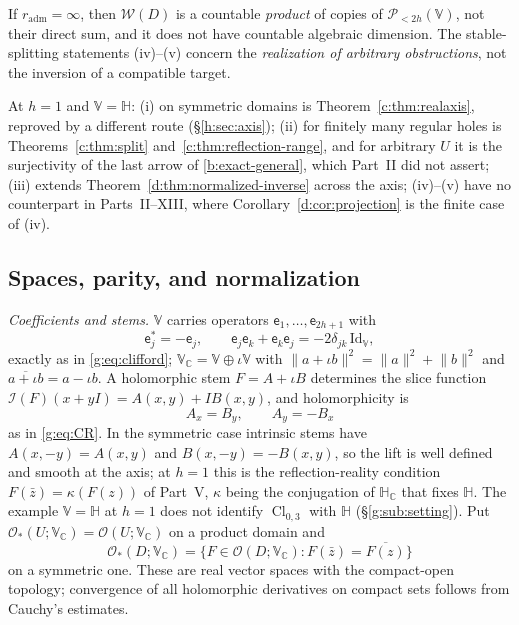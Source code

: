 \documentclass[11pt,a4paper]{article}
\numberwithin{equation}{section}
\theoremstyle{definition}
\theoremstyle{remark}
\theoremstyle{plain}
\newcommand{\HH}{\mathbb H}
\newcommand{\HC}{\mathbb H_{\mathbb C}}
\newcommand{\CC}{\mathbb C}
\newcommand{\I}{\mathcal I}
\newcommand{\norm}[1]{\lVert #1\rVert}
\newcommand{\VV}{\mathbb V}                       %
\newcommand{\VC}{\mathbb V_{\CC}}                 %
\newcommand{\PolH}{\mathscr P_{<2h}(\VV)}
\begin{document}
If $r_{\mathrm{adm}}=\infty$, then $\mathscr W(D)$ is a countable
\emph{product} of copies of $\PolH$, not their direct sum, and it does not have
countable algebraic dimension. The stable-splitting statements (iv)--(v)
concern the \emph{realization of arbitrary obstructions}, not the inversion of
a compatible target.

At $h=1$ and $\VV=\HH$: (i) on symmetric domains is
Theorem~\ref{c:thm:realaxis}, reproved by a different route
(\S\ref{h:sec:axis}); (ii) for finitely many regular holes is
Theorems~\ref{c:thm:split} and~\ref{c:thm:reflection-range}, and for arbitrary
$U$ it is the surjectivity of the last arrow of \eqref{b:exact-general}, which
Part~II did not assert; (iii) extends
Theorem~\ref{d:thm:normalized-inverse} across the axis; (iv)--(v) have no
counterpart in Parts~II--XIII, where Corollary~\ref{d:cor:projection} is the
finite case of (iv).

\subsection{Spaces, parity, and normalization}
\label{h:sec:spaces}

\emph{Coefficients and stems.} $\VV$ carries operators
$\mathsf e_1,\dots,\mathsf e_{2h+1}$ with
\begin{equation}\label{h:eq:clifford}
 \mathsf e_j^*=-\mathsf e_j,\qquad
 \mathsf e_j\mathsf e_k+\mathsf e_k\mathsf e_j=-2\delta_{jk}\,\mathrm{Id}_{\VV},
\end{equation}
exactly as in \eqref{g:eq:clifford}; $\VC=\VV\oplus\iota\VV$ with
$\norm{a+\iota b}^2=\norm a^2+\norm b^2$ and $\overline{a+\iota b}=a-\iota b$.
A holomorphic stem $F=A+\iota B$ determines the slice function
$\I(F)(x+yI)=A(x,y)+IB(x,y)$, and holomorphicity is
\begin{equation}\label{h:eq:CR}
 A_x=B_y,\qquad A_y=-B_x
\end{equation}
as in \eqref{g:eq:CR}. In the symmetric case intrinsic stems have
$A(x,-y)=A(x,y)$ and $B(x,-y)=-B(x,y)$, so the lift is well defined and smooth
at the axis; at $h=1$ this is the reflection-reality condition
$F(\bar z)=\kappa(F(z))$ of Part~V, $\kappa$ being the conjugation of $\HC$
that fixes $\HH$. The example $\VV=\HH$ at $h=1$ does not identify
$\operatorname{Cl}_{0,3}$ with $\HH$ (\S\ref{g:sub:setting}). Put
$\mathcal O_*(U;\VC)=\mathcal O(U;\VC)$ on a product domain and
\[
 \mathcal O_*(D;\VC)=\{F\in\mathcal O(D;\VC):F(\bar z)=\overline{F(z)}\}
\]
on a symmetric one. These are real vector spaces with the compact-open
topology; convergence of all holomorphic derivatives on compact sets follows
from Cauchy's estimates.
\end{document}
